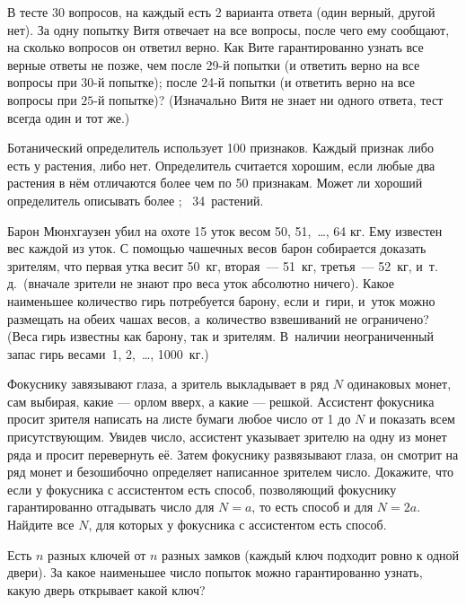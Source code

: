 \documentclass[12pt,a4paper]{article}
\begin{document}
В тесте $30$ вопросов, на каждый есть 2 варианта ответа
(один верный, другой нет).
За одну попытку Витя отвечает на все вопросы, после чего ему сообщают,
на сколько вопросов он ответил верно.
Как Вите гарантированно узнать все верные ответы не позже, чем
 после 29-й попытки
(и ответить верно на все вопросы при $30$-й попытке);
 после 24-й попытки
(и ответить верно на все вопросы при $25$-й попытке)?
(Изначально Витя не знает ни одного
ответа, тест всегда один и тот же.)

Ботанический определитель использует 100 признаков.
Каждый признак либо есть у растения, либо нет.
Определитель считается  хорошим, если любые два растения в нём отличаются
более чем по 50 признакам. Может ли хороший определитель
описывать более 
;
~34~растений.


Барон Мюнхгаузен убил на охоте 15 уток весом 50, 51,~\dots, 64 кг.
Ему известен вес каждой из уток. С помощью чашечных весов барон
собирается доказать зрителям, что первая
утка весит 50~кг, вторая~--- 51~кг, третья~--- 52~кг, и~т.\,д.\ (вначале зрители
не знают про веса уток абсолютно ничего). Какое наименьшее количество гирь
потребуется барону, если и~гири, и~уток можно размещать на обеих чашах весов,
а~количество взвешиваний не ограничено?
(Веса гирь известны как барону, так и зрителям.
В~наличии неограниченный запас гирь весами~1, 2,~\dots, 1000~кг.)

Фокуснику завязывают глаза, а зритель выкладывает в ряд $N$ одинаковых
монет, сам выбирая, какие --- орлом вверх, а какие --- решкой. Ассистент  фокусника
просит зрителя написать на листе бумаги любое число от 1 до $N$ и показать
всем присутствующим. Увидев число, ассистент
указывает зрителю на одну из монет ряда и просит
перевернуть её.
Затем фокуснику  развязывают
глаза,  он  смотрит на ряд монет и безошибочно определяет написанное
зрителем число.
  Докажите, что если у фокусника с ассистентом есть способ,
позволяющий фокуснику гарантированно отгадывать число
для $N=a$, то есть способ и для $N=2a$.
 Найдите все $N$, для которых у фокусника с ассистентом
есть способ.

Есть $n$ разных ключей от $n$ разных замков (каждый
ключ подходит ровно к одной двери). За какое наименьшее число
попыток можно гарантированно узнать, какую дверь открывает какой ключ?


\end{document}

